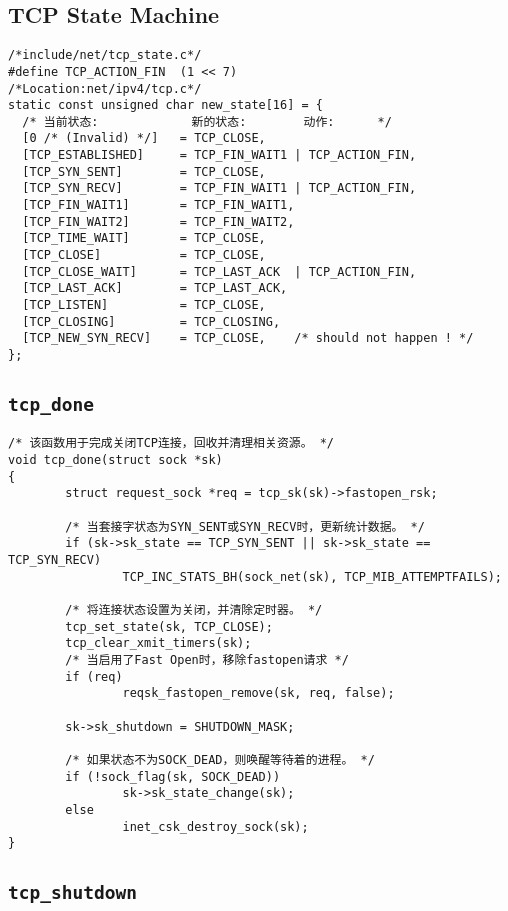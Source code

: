         \subsection{TCP State Machine}

\begin{verbatim}
/*include/net/tcp_state.c*/
#define TCP_ACTION_FIN  (1 << 7)
/*Location:net/ipv4/tcp.c*/
static const unsigned char new_state[16] = {
  /* 当前状态:             新的状态:        动作:      */
  [0 /* (Invalid) */]   = TCP_CLOSE,
  [TCP_ESTABLISHED]     = TCP_FIN_WAIT1 | TCP_ACTION_FIN,
  [TCP_SYN_SENT]        = TCP_CLOSE,
  [TCP_SYN_RECV]        = TCP_FIN_WAIT1 | TCP_ACTION_FIN,
  [TCP_FIN_WAIT1]       = TCP_FIN_WAIT1,
  [TCP_FIN_WAIT2]       = TCP_FIN_WAIT2,
  [TCP_TIME_WAIT]       = TCP_CLOSE,
  [TCP_CLOSE]           = TCP_CLOSE,
  [TCP_CLOSE_WAIT]      = TCP_LAST_ACK  | TCP_ACTION_FIN,
  [TCP_LAST_ACK]        = TCP_LAST_ACK,
  [TCP_LISTEN]          = TCP_CLOSE,
  [TCP_CLOSING]         = TCP_CLOSING,
  [TCP_NEW_SYN_RECV]    = TCP_CLOSE,    /* should not happen ! */
};
\end{verbatim}
	\subsection{\texttt{tcp_done}}
\begin{verbatim}
/* 该函数用于完成关闭TCP连接，回收并清理相关资源。 */
void tcp_done(struct sock *sk)
{
        struct request_sock *req = tcp_sk(sk)->fastopen_rsk;

        /* 当套接字状态为SYN_SENT或SYN_RECV时，更新统计数据。 */
        if (sk->sk_state == TCP_SYN_SENT || sk->sk_state == TCP_SYN_RECV)
                TCP_INC_STATS_BH(sock_net(sk), TCP_MIB_ATTEMPTFAILS);

        /* 将连接状态设置为关闭，并清除定时器。 */
        tcp_set_state(sk, TCP_CLOSE);
        tcp_clear_xmit_timers(sk);
        /* 当启用了Fast Open时，移除fastopen请求 */
        if (req)
                reqsk_fastopen_remove(sk, req, false);

        sk->sk_shutdown = SHUTDOWN_MASK;

        /* 如果状态不为SOCK_DEAD，则唤醒等待着的进程。 */
        if (!sock_flag(sk, SOCK_DEAD))
                sk->sk_state_change(sk);
        else
                inet_csk_destroy_sock(sk);
}
\end{verbatim}
    \subsection{\texttt{tcp_shutdown}}

